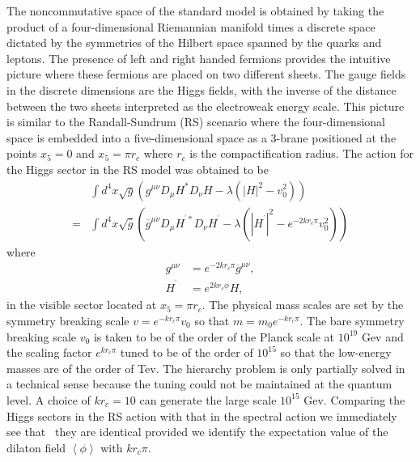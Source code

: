 \documentclass[12pt]{article}%
\begin{document}
The noncommutative space of the standard model is obtained by taking the
product of a four-dimensional Riemannian manifold times a discrete space
dictated by the symmetries of the Hilbert space spanned by the quarks and
leptons. The presence of left and right handed fermions provides the intuitive
picture where these fermions are placed on two different sheets. The gauge
fields in the discrete dimensions are the Higgs fields, with the inverse of
the distance between the two sheets interpreted as the electroweak energy
scale. This picture is similar to the Randall-Sundrum (RS) scenario where the
four-dimensional space is embedded into a five-dimensional space as a 3-brane
positioned at the points $x_{5}=0$ and $x_{5}=\pi r_{c}$ where $r_{c}$ is the
compactification radius. The action for the Higgs sector in the RS model
\cite{RS} was obtained to be
\begin{align*}
&
{\displaystyle\int}
d^{4}x\sqrt{g}\left(  g^{\mu\nu}D_{\mu}H^{\ast}D_{\nu}H-\lambda\left(
\left\vert H\right\vert ^{2}-v_{0}^{2}\right)  \right) \\
=  &
{\displaystyle\int}
d^{4}x\sqrt{\overline{g}}\left(  \overline{g}^{\mu\nu}D_{\mu}H^{^{\prime}\ast
}D_{\nu}H^{^{\prime}}-\lambda\left(  \left\vert H^{^{\prime}}\right\vert
^{2}-e^{-2kr_{c}\pi}v_{0}^{2}\right)  \right)
\end{align*}
where
\begin{align*}
g^{\mu\nu}  &  =e^{-2kr_{c}\pi}\overline{g}^{\mu\nu},\\
H^{^{\prime}}  &  =e^{2kr_{c}\phi}H,
\end{align*}
in the visible sector located at $x_{5}=\pi r_{c}.$ The physical mass scales
are set by the symmetry breaking scale $v=e^{-kr_{c}\pi}v_{0}$ so that
$m=m_{0}e^{-kr_{c}\pi}.$ The bare symmetry breaking scale $v_{0}$ is taken to
be of the order of the Planck scale at $10^{19}$ Gev and the scaling factor
$e^{kr_{c}\pi}$ tuned to be of the order of $10^{15}$ so that the low-energy
masses are of the order of Tev. The hierarchy problem is only partially solved
in a technical sense because the tuning could not be maintained at the quantum
level. A choice of $kr_{c}=10$ can generate the large scale $10^{15}$ Gev.
Comparing the Higgs sectors in the RS action with that in the spectral action
we immediately see that \ they are identical provided we identify the
expectation value of the dilaton field $\left\langle \phi\right\rangle $ with
$kr_{c}\pi.$
\end{document}
